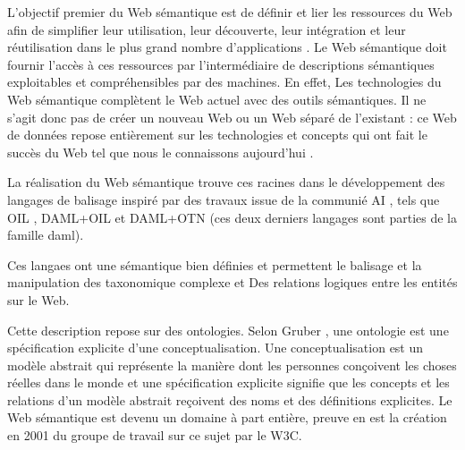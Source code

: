 


    L'objectif premier du Web sémantique est de définir et lier les
    ressources du Web afin de simplifier leur utilisation, leur
    découverte, leur intégration et leur réutilisation dans le plus
    grand nombre d'applications \cite{berners2001semantic}. Le Web
    sémantique doit fournir l'accès à ces ressources par
    l'intermédiaire de descriptions sémantiques exploitables et
    compréhensibles par des machines. En effet, Les technologies du
    Web sémantique complètent le Web actuel avec des outils
    sémantiques. Il ne s'agit donc pas de créer un nouveau Web ou un
    Web séparé de l'existant : ce Web de données repose entièrement
    sur les technologies et concepts qui ont fait le succès du Web tel
    que nous le connaissons aujourd'hui \cite{bertails2010web}.

    La réalisation du Web sémantique trouve ces racines dans le
    développement des langages de balisage inspiré par des travaux
    issue de la communié AI \cite{mcilraith2001semantic}, tels que
    \textsc{OIL} \cite{fensel2001oil}, \textsc{DAML+OIL}
    \cite{horrocks2002daml+oil} et \textsc{DAML+OTN}
    \cite{mcguinness2003daml} (ces deux derniers langages sont parties
    de la famille \acrshort{daml}).

    Ces langaes ont une sémantique bien définies et permettent le
    balisage et la manipulation des taxonomique complexe et Des
    relations logiques entre les entités sur le
    Web. \cite{fensel2000creating}

    

    Cette description repose sur des ontologies. Selon Gruber
    \cite{gruber1993translation}, une ontologie est une spécification
    explicite d'une conceptualisation. Une conceptualisation est un
    modèle abstrait qui représente la manière dont les personnes
    conçoivent les choses réelles dans le monde et une spécification
    explicite signifie que les concepts et les relations d'un modèle
    abstrait reçoivent des noms et des définitions explicites. Le Web
    sémantique est devenu un domaine à part entière, preuve en est la
    création en 2001 du groupe de travail sur ce sujet par le
    \textsc{W3C}.



